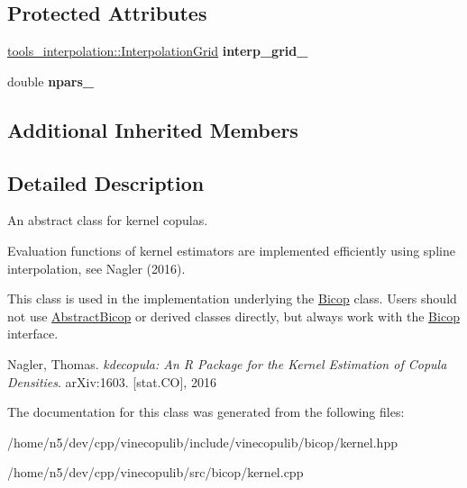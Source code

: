 \subsection*{Protected Attributes}
\begin{DoxyCompactItemize}
\item 
\hyperlink{classvinecopulib_1_1tools__interpolation_1_1_interpolation_grid}{tools\+\_\+interpolation\+::\+Interpolation\+Grid} {\bfseries interp\+\_\+grid\+\_\+}\hypertarget{classvinecopulib_1_1_kernel_bicop_ae3499afa748f324e0f7fbb596a5c8628}{}\label{classvinecopulib_1_1_kernel_bicop_ae3499afa748f324e0f7fbb596a5c8628}

\item 
double {\bfseries npars\+\_\+}\hypertarget{classvinecopulib_1_1_kernel_bicop_a1b49a0a2630e71079c08ebdca79b06b6}{}\label{classvinecopulib_1_1_kernel_bicop_a1b49a0a2630e71079c08ebdca79b06b6}

\end{DoxyCompactItemize}
\subsection*{Additional Inherited Members}


\subsection{Detailed Description}
An abstract class for kernel copulas. 

Evaluation functions of kernel estimators are implemented efficiently using spline interpolation, see Nagler (2016).

This class is used in the implementation underlying the \hyperlink{classvinecopulib_1_1_bicop}{Bicop} class. Users should not use \hyperlink{classvinecopulib_1_1_abstract_bicop}{Abstract\+Bicop} or derived classes directly, but always work with the \hyperlink{classvinecopulib_1_1_bicop}{Bicop} interface.

Nagler, Thomas. {\itshape kdecopula\+: An R Package for the Kernel Estimation of Copula Densities}. ar\+Xiv\+:1603. \mbox{[}stat.\+CO\mbox{]}, 2016 

The documentation for this class was generated from the following files\+:\begin{DoxyCompactItemize}
\item 
/home/n5/dev/cpp/vinecopulib/include/vinecopulib/bicop/kernel.\+hpp\item 
/home/n5/dev/cpp/vinecopulib/src/bicop/kernel.\+cpp\end{DoxyCompactItemize}
